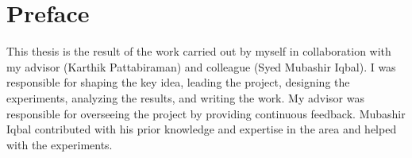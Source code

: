 
\chapter{Preface}
This thesis is the result of the work carried out by myself in collaboration with my advisor (Karthik Pattabiraman) and colleague (Syed Mubashir Iqbal). 
I was responsible for shaping the key idea, leading the project, designing the experiments, analyzing the results, and writing the work.
My advisor was responsible for overseeing the project by providing continuous feedback.
Mubashir Iqbal contributed with his prior knowledge and expertise in the area and helped with the experiments.

